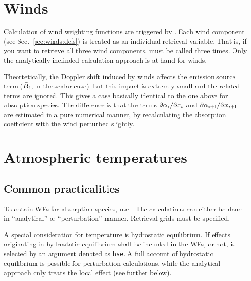\section{Winds}
\label{sec:wfuns:winds}
%
Calculation of wind weighting functions are triggered by
. Each wind component (see Sec.~\ref{sec:winds:defs})
is treated as an individual retrieval variable. That is, if you want to
retrieve all three wind components,  must be called
three times. Only the analytically inclinded calculation approach is at hand
for winds.

Theortetically, the Doppler shift induced by winds affects the emission source
term ($\bar{B}_i$, in the scalar case), but this impact is extremly small
and the related terms are ignored. This gives a case basically identical to the
one above for absorption species. The difference is that the terms
$\partial{\alpha}_{i}/\partial x_{i}$ and
$\partial{\alpha}_{i+1}/\partial x_{i+1}$ are estimated in a pure numerical
manner, by recalculating the absorption coefficient with the wind perturbed
slightly.





\section{Atmospheric temperatures}
\label{sec:wfuns:atmtemp}

\subsection{Common practicalities}
%
To obtain WFs for absorption species, use .
The calculations can either be done in ``analytical'' or ``perturbation''
manner. Retrieval grids must be specified.

A special consideration for temperature is hydrostatic equilibrium. If effects
originating in hydrostatic equilibrium shall be included in the WFs, or
not, is selected by an argument denoted as \verb|hse|. A full account of
hydrostatic equilibrium is possible for perturbation calculations, while the
analytical approach only treats the local effect (see further below).


